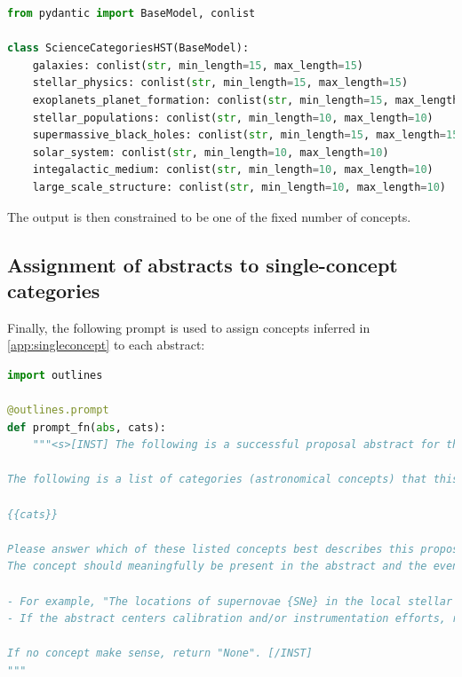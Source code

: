 \documentclass[10pt]{article} %
\begin{document}
\begin{lstlisting}[language=Python]
from pydantic import BaseModel, conlist
  
class ScienceCategoriesHST(BaseModel):
    galaxies: conlist(str, min_length=15, max_length=15)
    stellar_physics: conlist(str, min_length=15, max_length=15)
    exoplanets_planet_formation: conlist(str, min_length=15, max_length=15)
    stellar_populations: conlist(str, min_length=10, max_length=10)
    supermassive_black_holes: conlist(str, min_length=15, max_length=15)
    solar_system: conlist(str, min_length=10, max_length=10)
    integalactic_medium: conlist(str, min_length=10, max_length=10)
    large_scale_structure: conlist(str, min_length=10, max_length=10)
  \end{lstlisting}

The output is then constrained to be one of the fixed number of concepts.
  
\subsection{Assignment of abstracts to single-concept categories}
\label{app:singleconceptassignments}

Finally, the following prompt is used to assign concepts inferred in \ref{app:singleconcept} to each abstract:

\begin{lstlisting}[language=Python]
import outlines 

@outlines.prompt
def prompt_fn(abs, cats):
    """<s>[INST] The following is a successful proposal abstract for the Hubble Space Telescope: "{{abs}}"

The following is a list of categories (astronomical concepts) that this abstract could correspond to.

{{cats}}

Please answer which of these listed concepts best describes this proposal, based on the objects and phenomena mentioned in the abstract.
The concept should meaningfully be present in the abstract and the eventual observation.

- For example, "The locations of supernovae {SNe} in the local stellar and gaseous environment in galaxies, as measured in high spatial resolution WFPC2 and ACS images, contain important clues to their progenitor stars." should return "supernova".
- If the abstract centers calibration and/or instrumentation efforts, return calibration or instrumention".

If no concept make sense, return "None". [/INST]
"""
\end{lstlisting}
\end{document}
